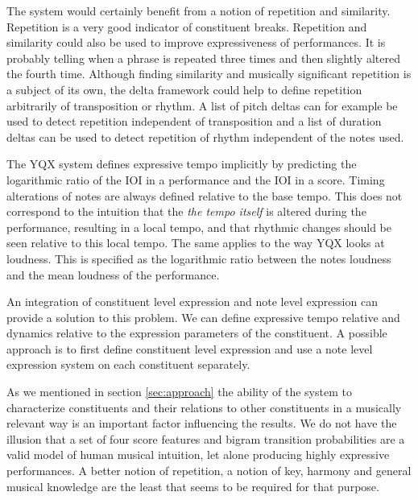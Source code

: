 \documentclass[a4paper,10pt]{article}
\begin{document}
The system would certainly benefit from a notion of repetition and similarity. Repetition is a very good indicator of constituent breaks. Repetition and similarity could also be used to improve expressiveness of performances. It is probably telling when a phrase is repeated three times and then slightly altered the fourth time. Although finding similarity and musically significant repetition is a subject of its own, the delta framework could help to define repetition arbitrarily of transposition or rhythm. A list of pitch deltas can for example be used to detect repetition independent of transposition and a list of duration deltas can be used to detect repetition of rhythm independent of the notes used. 

The YQX system defines expressive tempo implicitly by predicting the logarithmic ratio of the IOI in a performance and the IOI in a score. Timing alterations of notes are always defined relative to the base tempo. This does not correspond to the intuition that the \textit{the tempo itself} is altered during the performance, resulting in a local tempo, and that rhythmic changes should be seen relative to this local tempo. The same applies to the way YQX looks at loudness. This is specified as the logarithmic ratio between the notes loudness and the mean loudness of the performance. 

An integration of constituent level expression and note level expression can provide a solution to this problem. We can define expressive tempo relative and dynamics relative to the expression parameters of the constituent. A possible approach is to first define constituent level expression and use a note level expression system on each constituent separately.

As we mentioned in section \ref{sec:approach} the ability of the system to characterize constituents and their relations to other constituents in a musically relevant way is an important factor influencing the results. We do not have the illusion that a set of four score features and bigram transition probabilities are a valid model of human musical intuition, let alone producing highly expressive performances. A better notion of repetition, a notion of key, harmony and general musical knowledge are the least that seems to be required for that purpose.
\end{document}
